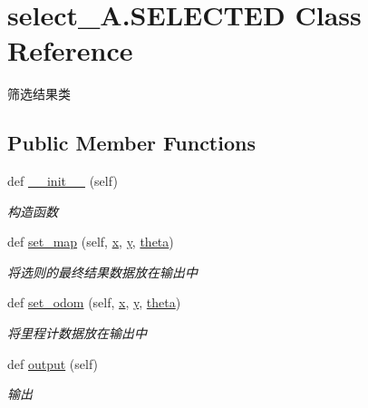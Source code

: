 \hypertarget{classselect___a_1_1_s_e_l_e_c_t_e_d}{}\section{select\+\_\+\+A.\+S\+E\+L\+E\+C\+T\+ED Class Reference}
\label{classselect___a_1_1_s_e_l_e_c_t_e_d}


筛选结果类  


\subsection*{Public Member Functions}
\begin{DoxyCompactItemize}
\item 
def \hyperlink{classselect___a_1_1_s_e_l_e_c_t_e_d_af17cc2a59273174c7a49668adb3535b3}{\+\_\+\+\_\+init\+\_\+\+\_\+} (self)
\begin{DoxyCompactList}\small\item\em 构造函数 \end{DoxyCompactList}\item 
def \hyperlink{classselect___a_1_1_s_e_l_e_c_t_e_d_a10cd1ee60b084dd2a648527d63d75c08}{set\+\_\+map} (self, \hyperlink{classselect___a_1_1_s_e_l_e_c_t_e_d_a122a40eda7d2f01ef7f841e50cc2551a}{x}, \hyperlink{classselect___a_1_1_s_e_l_e_c_t_e_d_a10eb0746408bf490fb698405f8c46560}{y}, \hyperlink{classselect___a_1_1_s_e_l_e_c_t_e_d_a675a284225cd021c81e2d8e681bde862}{theta})
\begin{DoxyCompactList}\small\item\em 将选则的最终结果数据放在输出中 \end{DoxyCompactList}\item 
def \hyperlink{classselect___a_1_1_s_e_l_e_c_t_e_d_a2a0c99877c117015d42c1d84e31f504a}{set\+\_\+odom} (self, \hyperlink{classselect___a_1_1_s_e_l_e_c_t_e_d_a122a40eda7d2f01ef7f841e50cc2551a}{x}, \hyperlink{classselect___a_1_1_s_e_l_e_c_t_e_d_a10eb0746408bf490fb698405f8c46560}{y}, \hyperlink{classselect___a_1_1_s_e_l_e_c_t_e_d_a675a284225cd021c81e2d8e681bde862}{theta})
\begin{DoxyCompactList}\small\item\em 将里程计数据放在输出中 \end{DoxyCompactList}\item 
def \hyperlink{classselect___a_1_1_s_e_l_e_c_t_e_d_a46c0648a3bcbf5a97f551412a83b1641}{output} (self)
\begin{DoxyCompactList}\small\item\em 输出 \end{DoxyCompactList}\end{DoxyCompactItemize}
